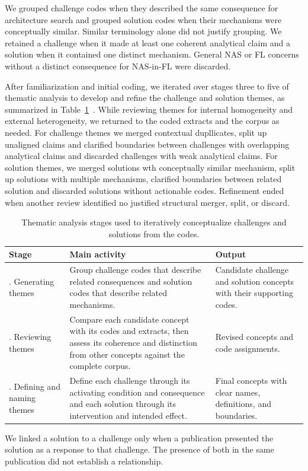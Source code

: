 We grouped challenge codes when they described the same consequence for architecture search and grouped solution codes when their mechanisms were conceptually similar. Similar terminology alone did not justify grouping. We retained a challenge when it made at least one coherent analytical claim and a solution when it contained one distinct mechanism. General NAS or FL concerns without a distinct consequence for NAS-in-FL were discarded.

After familiarization and initial coding, we iterated over stages three to five of thematic analysis to develop and refine the challenge and solution themes, as summarized in Table~\ref{table:thematic-analysis-stages}~\cite{using_thematic_analysis_2006}. While reviewing themes for internal homogeneity and external heterogeneity, we returned to the coded extracts and the corpus as needed. For challenge themes we merged contextual dupllicates, split up unaligned claims and clarified boundaries between challenges with overlapping analytical claims and discarded challenges with weak analytical claims. For solution themes, we merged solutions wth conceptually similar mechanism, split up solutions with multiple mechanisms, clarified boundaries between related solution and discarded solutions without actionable codes. Refinement ended when another review identified no justified structural merger, split, or discard.

\begin{table}[htbp]
    \centering
    \footnotesize
    \caption{Thematic analysis stages used to iteratively conceptualize challenges and solutions from the codes.}
    \label{table:thematic-analysis-stages}
    \begin{tabularx}{\textwidth}{@{}
        >{\raggedright\arraybackslash}p{}
        X
        >{\raggedright\arraybackslash}p{}
    @{}}
        \toprule
        \textbf{Stage} & \textbf{Main activity} & \textbf{Output} \\
        \midrule
        3. Generating themes & Group challenge codes that describe related consequences and solution codes that describe related mechanisms. & Candidate challenge and solution concepts with their supporting codes. \\
        4. Reviewing themes & Compare each candidate concept with its codes and extracts, then assess its coherence and distinction from other concepts against the complete corpus. & Revised concepts and code assignments. \\
        5. Defining and naming themes & Define each challenge through its activating condition and consequence and each solution through its intervention and intended effect. & Final concepts with clear names, definitions, and boundaries. \\
        \bottomrule
    \end{tabularx}
\end{table}

We linked a solution to a challenge only when a publication presented the solution as a response to that challenge. The presence of both in the same publication did not establish a relationship.
